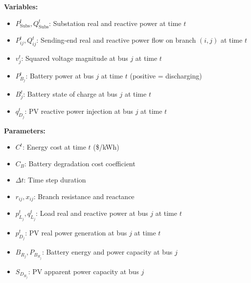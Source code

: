 \textbf{Variables:}
\begin{itemize}
    \item $P^t_{\text{Subs}}, Q^t_{\text{Subs}}$: Substation real and reactive power at time $t$
    \item $P_{ij}^t, Q_{ij}^t$: Sending-end real and reactive power flow on branch $(i,j)$ at time $t$
    \item $v_j^t$: Squared voltage magnitude at bus $j$ at time $t$
    \item $P_{B_j}^t$: Battery power at bus $j$ at time $t$ (positive = discharging)
    \item $B_j^t$: Battery state of charge at bus $j$ at time $t$
    \item $q_{D_j}^t$: PV reactive power injection at bus $j$ at time $t$
\end{itemize}

\textbf{Parameters:}
\begin{itemize}
    \item $C^t$: Energy cost at time $t$ (\$/kWh)
    \item $C_B$: Battery degradation cost coefficient
    \item $\Delta t$: Time step duration
    \item $r_{ij}, x_{ij}$: Branch resistance and reactance
    \item $p_{L_j}^t, q_{L_j}^t$: Load real and reactive power at bus $j$ at time $t$
    \item $p_{D_j}^t$: PV real power generation at bus $j$ at time $t$
    \item $B_{R_j}, P_{B_{R_j}}$: Battery energy and power capacity at bus $j$
    \item $S_{D_{R_j}}$: PV apparent power capacity at bus $j$
\end{itemize}